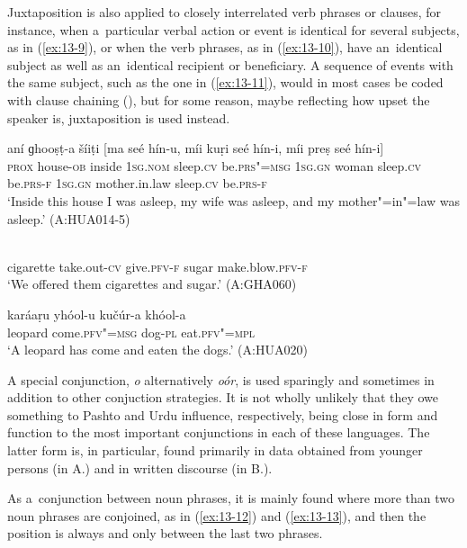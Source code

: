 Juxtaposition is also applied to closely interrelated verb phrases or clauses, for instance, when a~particular verbal action or event is identical for several subjects, as in (\ref{ex:13-9}), or when the verb phrases, as in (\ref{ex:13-10}), have an~identical subject as well as an~identical recipient or beneficiary. A sequence of events with the same subject, such as the one in (\ref{ex:13-11}), would in most cases be coded with clause chaining (), but for some reason, maybe reflecting how upset the speaker is, juxtaposition is used instead.

\begin{exe}
\ex
\label{ex:13-9}
\gll aní ɡhooṣṭ-a šíiṭi [ma seé hín-u, míi kuṛi seé hín-i, míi preṣ seé hín-i] \\
\textsc{prox} house-\textsc{ob} inside \textsc{1sg.nom} sleep.\textsc{cv} be.\textsc{prs"=msg}  \textsc{1sg.gn} woman sleep.\textsc{cv} be.\textsc{prs-f } \textsc{1sg.gn} mother.in.law sleep.\textsc{cv} be.\textsc{prs-f} \\
\glt `Inside this house I was asleep, my wife was asleep, and my mother"=in"=law was asleep.' (A:HUA014-5)

\ex
\label{ex:13-10}
  \\
cigarette take.out-\textsc{cv} give.\textsc{pfv-f} sugar make.blow.\textsc{pfv-f} \\
\glt `We offered them cigarettes and sugar.' (A:GHA060)

\ex
\label{ex:13-11}
\gll karáaṛu yhóol-u kučúr-a khóol-a  \\
leopard come.\textsc{pfv"=msg} dog-\textsc{pl} eat.\textsc{pfv"=mpl} \\
\glt `A leopard has come and eaten the dogs.' (A:HUA020) 
\end{exe}

 A special conjunction, \textit{o} alternatively \textit{oór}, is used sparingly and sometimes in addition to other conjuction strategies. It is not wholly unlikely that they owe something to Pashto and Urdu influence, respectively, being close in form and function to the most important conjunctions in each of these languages. The latter form is, in particular, found primarily in data obtained from younger persons (in A.) and in written discourse (in B.). 


As a~conjunction between noun phrases, it is mainly found where more than two noun phrases are conjoined, as in (\ref{ex:13-12}) and (\ref{ex:13-13}), and then the position is always and only between the last two phrases.

